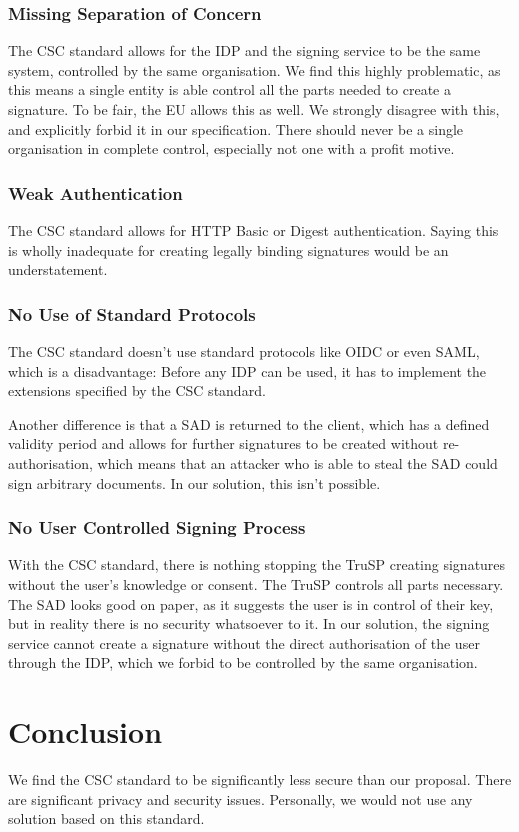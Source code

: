 \subsubsection{Missing Separation of Concern}
The \gls{CSC} standard allows for the \gls{IDP} and the signing service to be the same system,
controlled by the same organisation.
We find this highly problematic, as this means a single entity is able control all the parts needed to create a signature.
To be fair, the \gls{EU} allows this as well.
We strongly disagree with this, and explicitly forbid it in our specification.
There should never be a single organisation in complete control, especially not one with a profit motive.

\subsubsection{Weak Authentication}
The \gls{CSC} standard allows for \gls{HTTP} Basic or Digest authentication.
Saying this is wholly inadequate for creating legally binding signatures would be an understatement.

\subsubsection{No Use of Standard Protocols}
The \gls{CSC} standard doesn't use standard protocols like \gls{OIDC} or even \gls{SAML},
which is a disadvantage:
Before any \gls{IDP} can be used, it has to implement the extensions specified by the \gls{CSC} standard.

Another difference is that a \gls{SAD} is returned to the client,
which has a defined validity period and allows for further signatures to be created without re-authorisation,
which means that an attacker who is able to steal the \gls{SAD} could sign arbitrary documents.
In our solution, this isn't possible.

\subsubsection{No User Controlled Signing Process}
With the \gls{CSC} standard, there is nothing stopping the \gls{TruSP} creating signatures without the user's knowledge or consent.
The \gls{TruSP} controls all parts necessary.
The \gls{SAD} looks good on paper,
as it suggests the user is in control of their key,
but in reality there is no security whatsoever to it.
In our solution, the signing service cannot create a signature without the direct authorisation of the user through the \gls{IDP},
which we forbid to be controlled by the same organisation.

\section{Conclusion}\label{sec:conclusion}
We find the \gls{CSC} standard to be significantly less secure than our proposal.
There are significant privacy and security issues.
Personally, we would not use any solution based on this standard.
